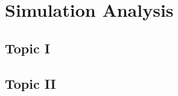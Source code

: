 \section{Simulation Analysis}
\label{sec:simulation}

\subsection{Topic I}
\label{subsec:sim_first}




\subsection{Topic II}
\label{subsec:sim_second}

